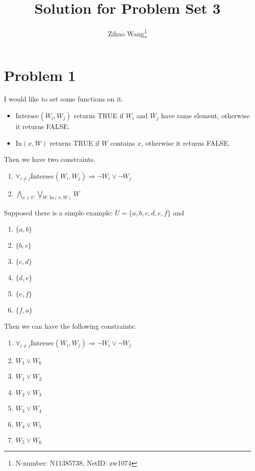 \documentclass[11pt]{article}
\author{Zihao Wang\footnote{N-number: N11385738, NetID: zw1074}
	}
\title{\textbf{Solution for Problem Set 3}}
\begin{document}
	\maketitle
	\section*{Problem 1}
	I would like to set some functions on it.
	\begin{itemize}
		\item $ \mbox{Intersec}(W_i,W_j) $ returns TRUE if $ W_i $ and $ W_j $ have same element, otherwise it returns FALSE.
		\item $ \mbox{In}(x,W) $ returns TRUE if $ W $ contains $ x $, otherwise it returns FALSE.
	\end{itemize}
	Then we have two constraints.
	\begin{enumerate}[1.]
		\item $ \forall_{i\neq j}\mbox{Intersec}(W_i,W_j) \Rightarrow \neg W_i\vee \neg W_j $
		\item $ \bigwedge_{x\in U}\bigvee_{W:\mbox{In}(x,W)}W $
	\end{enumerate}
	Supposed there is a simple example: $ U=\{a,b,c,d,e,f\} $ and 
	\begin{enumerate}[$ W_1 = $]
		\item $ \{a,b\} $
		\item $ \{b,c\} $
		\item $ \{c,d\} $
		\item $ \{d,e\} $
		\item $ \{e,f\} $
		\item $ \{f,a\} $
	\end{enumerate}
	Then we can have the following constraints:
	\begin{enumerate}[1.]
		\item $ \forall_{i\neq j}\mbox{Intersec}(W_i,W_j) \Rightarrow \neg W_i\vee \neg W_j $
		\item $ W_1\vee W_6 $
		\item $ W_1\vee W_2 $
		\item $ W_2\vee W_3 $
		\item $ W_3\vee W_4 $
		\item $ W_4\vee W_5 $
		\item $ W_5\vee W_6 $
	\end{enumerate}
\end{document}
